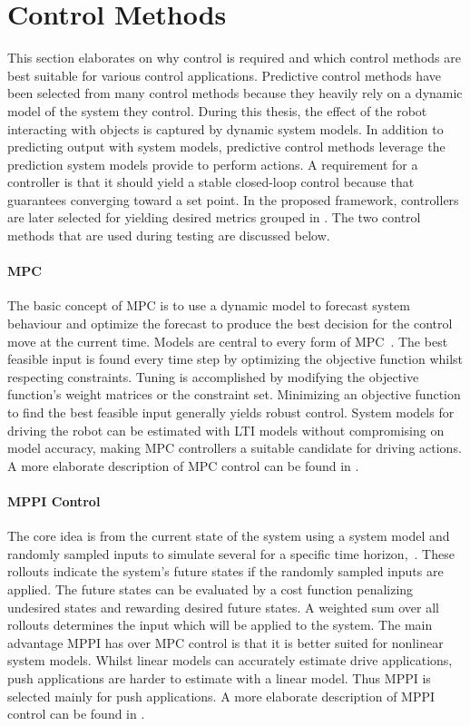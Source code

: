 \section{Control Methods}%
\label{sec:control_methods}
This section elaborates on why control is required and which control methods are best suitable for various control applications. Predictive control methods have been selected from many control methods because they heavily rely on a dynamic model of the system they control. During this thesis, the effect of the robot interacting with objects is captured by dynamic system models. In addition to predicting output with system models, predictive control methods leverage the prediction system models provide to perform actions. A requirement for a controller is that it should yield a stable closed-loop control because that guarantees converging toward a set point. In the proposed framework, controllers are later selected for yielding desired metrics grouped in . The two control methods that are used during testing are discussed below.\bs

\paragraph{\acl{MPC}}
The basic concept of \ac{MPC} is to use a dynamic model to forecast system behaviour and optimize the forecast to produce the best decision for the control move at the current time. Models are central to every form of \ac{MPC}~\cite{rawlings_model_2020}. The best feasible input is found every time step by optimizing the objective function whilst respecting constraints. Tuning is accomplished by modifying the objective function's weight matrices or the constraint set. Minimizing an objective function to find the best feasible input generally yields robust control. System models for driving the robot can be estimated with \ac{LTI} models without compromising on model accuracy, making \ac{MPC} controllers a suitable candidate for driving actions. A more elaborate description of \ac{MPC} control can be found in .\bs

\paragraph{\acl{MPPI} Control}
The core idea is from the current state of the system using a system model and randomly sampled inputs to simulate several  for a specific time horizon,~\cite{neuromorphictutorial_ltc21_2021}. These rollouts indicate the system's future states if the randomly sampled inputs are applied. The future states can be evaluated by a cost function penalizing undesired states and rewarding desired future states. A weighted sum over all rollouts determines the input which will be applied to the system. The main advantage \ac{MPPI} has over \ac{MPC} control is that it is better suited for nonlinear system models. Whilst linear models can accurately estimate drive applications, push applications are harder to estimate with a linear model. Thus \ac{MPPI} is selected mainly for push applications. A more elaborate description of \ac{MPPI} control can be found in .\bs

